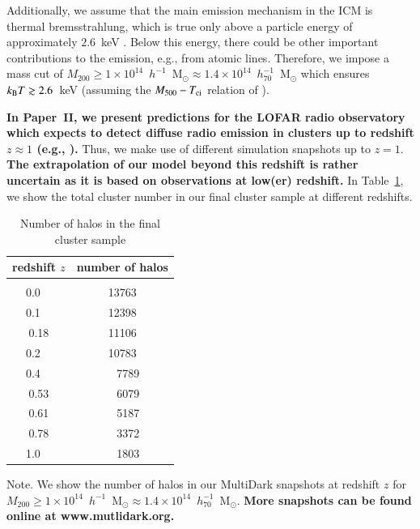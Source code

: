 \documentclass[useAMS,usenatbib]{mn2e}
\begin{document}
Additionally, we assume that the main emission mechanism in the ICM is thermal
bremsstrahlung, which is true only above a particle energy of approximately
$2.6$~keV \citep{1988xrec.book.....S}. Below this
energy, there could be other important contributions to the emission,
e.g., from atomic lines. Therefore, we impose a mass cut of
$M_{200}\geq1\times10^{14}$~$h^{-1}$~M$_{\odot}\approx1.4\times10^{14}$~$h_{70}^{-1}$~M$_{\odot}$
which ensures $k_{{\mathrm{B}}}T \gtrsim 2.6$~keV (assuming the $M_{500} - T_{{\mathrm{ci}}}$ relation
of \citealt{2010MNRAS.406.1773M}).

{\bf In Paper~II, we present predictions for the LOFAR radio observatory which
  expects to detect diffuse radio emission in clusters up to redshift $z \approx
  1$ (e.g., \citealp{2012JApA..tmp...34R}).} Thus, we make use of different
simulation snapshots up to $z=1$.  {\bf The extrapolation of our model beyond
  this redshift is rather uncertain as it is based on observations at low(er)
  redshift.} In Table~\ref{tab:z}, we show the total cluster number in our final
cluster sample at different redshifts.

\begin{table} 
\begin{center}
\caption{Number of halos in the final cluster sample}
\medskip
\begin{tabular}{cc}
\hline
\phantom{\Big|}
redshift $z$ & number of halos \\
\hline\\[-0.5em]
 0.0~~ &  13763\\
 0.1~~ &  12398\\
 0.18 &  11106\\
 0.2~~ &  10783\\ 
 0.4~~ &   ~~7789\\
 0.53 & ~~6079\\ 
 0.61 &  ~~5187\\ 
 0.78 &  ~~3372\\ 
 1.0~~ &  ~~1803\\[0.5em]
\hline
\end{tabular}
\label{tab:z}
\end{center}
\footnotesize{Note. We show the number of halos in our MultiDark snapshots at redshift $z$ for $M_{200}\geq1\times10^{14}$~$h^{-1}$~M$_{\odot}\approx1.4\times10^{14}$~$h_{70}^{-1}$~M$_{\odot}$. {\bf More snapshots can be found online at www.mutlidark.org.}}
\end{table}


\end{document}
